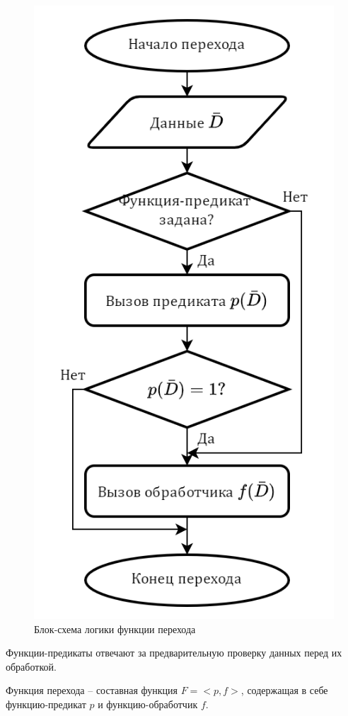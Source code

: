 \begin{frame}
\begin{figure}
\begin{minipage}{0.49\textwidth}
			\includegraphics[height=0.5\textheight]{images/flowchart.Transfer.png}
			\caption{Блок-схема логики функции перехода}
		\end{minipage}\hfill
	\end{figure}

	Функции-предикаты отвечают за предварительную проверку данных перед их обработкой.

	Функция перехода -- составная функция $F=<p,f>$, содержащая в себе функцию-предикат $p$ и функцию-обработчик $f$.
\end{frame}

